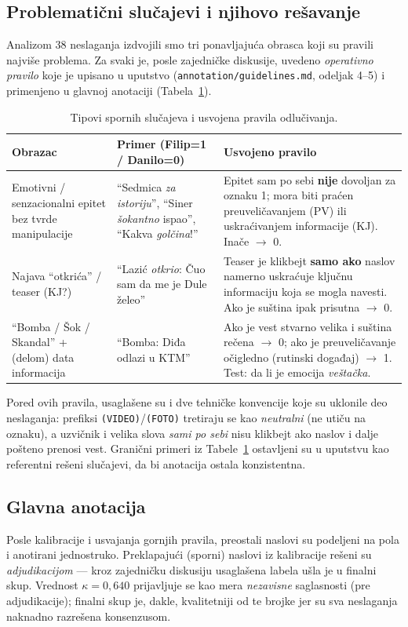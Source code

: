 \documentclass[11pt,a4paper]{article}
\begin{document}
\subsection{Problematični slučajevi i njihovo rešavanje}\label{sec:sporni}
Analizom 38 neslaganja izdvojili smo tri ponavljajuća obrasca koji su pravili najviše
problema. Za svaki je, posle zajedničke diskusije, uvedeno \emph{operativno pravilo}
koje je upisano u uputstvo (\texttt{annotation/guidelines.md}, odeljak 4--5) i
primenjeno u glavnoj anotaciji (Tabela~\ref{tab:sporni}).

\begin{table}[H]\centering
\caption{Tipovi spornih slučajeva i usvojena pravila odlučivanja.}\label{tab:sporni}
\renewcommand{\arraystretch}{1.3}
\begin{tabular}{p{3cm} p{5.5cm} p{5.5cm}}
\toprule
\textbf{Obrazac} & \textbf{Primer (Filip=1 / Danilo=0)} & \textbf{Usvojeno pravilo} \\
\midrule
Emotivni / senzacionalni epitet bez tvrde manipulacije &
\enquote{Sedmica \emph{za istoriju}}, \enquote{Siner \emph{šokantno} ispao}, \enquote{Kakva \emph{golčina}!} &
Epitet sam po sebi \textbf{nije} dovoljan za oznaku 1; mora biti praćen
preuveličavanjem (PV) ili uskraćivanjem informacije (KJ). Inače $\to$ 0. \\
\midrule
Najava \enquote{otkrića} / teaser (KJ?) &
\enquote{Lazić \emph{otkrio}: Čuo sam da me je Dule želeo} &
Teaser je klikbejt \textbf{samo ako} naslov namerno uskraćuje ključnu informaciju
koja se mogla navesti. Ako je suština ipak prisutna $\to$ 0. \\
\midrule
\enquote{Bomba / Šok / Skandal} + (delom) data informacija &
\enquote{Bomba: Diđa odlazi u KTM} &
Ako je vest stvarno velika i suština rečena $\to$ 0; ako je preuveličavanje očigledno
(rutinski događaj) $\to$ 1. Test: da li je emocija \emph{veštačka}. \\
\bottomrule
\end{tabular}
\end{table}

Pored ovih pravila, usaglašene su i dve tehničke konvencije koje su uklonile deo
neslaganja: prefiksi \texttt{(VIDEO)}/\texttt{(FOTO)} tretiraju se kao \emph{neutralni}
(ne utiču na oznaku), a uzvičnik i velika slova \emph{sami po sebi} nisu klikbejt ako
naslov i dalje pošteno prenosi vest. Granični primeri iz Tabele~\ref{tab:sporni}
ostavljeni su u uputstvu kao referentni rešeni slučajevi, da bi anotacija ostala
konzistentna.

\subsection{Glavna anotacija}
Posle kalibracije i usvajanja gornjih pravila, preostali naslovi su podeljeni na pola
i anotirani jednostruko. Preklapajući (sporni) naslovi iz kalibracije rešeni su
\emph{adjudikacijom} --- kroz zajedničku diskusiju usaglašena labela ušla je u finalni
skup. Vrednost $\kappa = 0{,}640$ prijavljuje se kao mera \emph{nezavisne} saglasnosti
(pre adjudikacije); finalni skup je, dakle, kvalitetniji od te brojke jer su sva
neslaganja naknadno razrešena konsenzusom.
\end{document}
